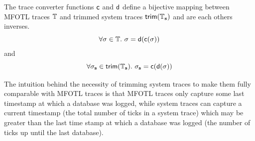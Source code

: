 \begin{theorem}
    \label{theo:trace-equivalence}
    The trace converter functions $\mathsf{c}$ and $\mathsf{d}$ define a
    bijective mapping between MFOTL traces $\mathbb{T}$ and
    trimmed system traces $\mathsf{trim}(\mathbb{T}_{\mathbf{s}})$
    and are each others inverses.
    \begin{equation*}
        \forall \sigma \in \mathbb{T} .~
        \sigma = \mathsf{d}(\mathsf{c}(\sigma))
    \end{equation*}
    and
    \begin{equation*}
        \forall \sigma_{\mathbf{s}} \in \mathsf{trim}(\mathbb{T}_{\mathbf{s}}) .~
        \sigma_{\mathbf{s}} = \mathsf{c}(\mathsf{d}(\sigma))
    \end{equation*}
\end{theorem}

The intuition behind the necessity of trimming system traces to make
them fully comparable with MFOTL traces is that MFOTL traces only capture
some last timestamp at which a database was logged, while system traces
can capture a current timestamp (the total number of ticks in a system trace)
which may be greater than the last time stamp at which a database was logged
(the number of ticks up until the last database).

